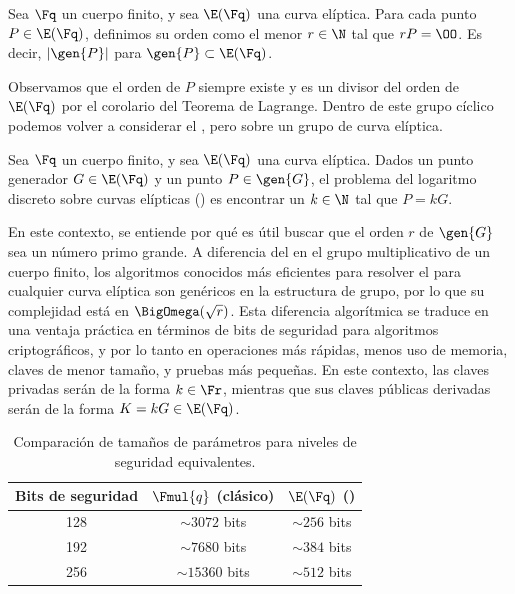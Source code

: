 \begin{definition}
		Sea $\Fq$ un cuerpo finito, y sea $\E(\Fq)$ una curva elíptica. Para cada punto $P \in \E(\Fq)$, definimos su orden como el menor $r \in \N$ tal que $rP = \OO$. Es decir, $|\gen{P}|$ para $\gen{P} \subset \E(\Fq)$.
\end{definition}

Observamos que el orden de $P$ siempre existe y es un divisor del orden de $\E(\Fq)$ por el corolario del Teorema de Lagrange. Dentro de este grupo cíclico podemos volver a considerar el \DLP, pero sobre un grupo de curva elíptica.

\begin{definition}[\ECDLP]
		Sea $\Fq$ un cuerpo finito, y sea $\E(\Fq)$ una curva elíptica. Dados un punto generador $G \in \E(\Fq)$ y un punto $P \in \gen{G}$, el problema del logaritmo discreto sobre curvas elípticas (\ECDLP) es encontrar un $k \in \N$ tal que $P = kG$.
\end{definition}

En este contexto, se entiende por qué es útil buscar que el orden $r$ de $\gen{G}$ sea un número primo grande. A diferencia del \DLP en el grupo multiplicativo de un cuerpo finito, los algoritmos conocidos más eficientes para resolver el \ECDLP para cualquier curva elíptica son genéricos en la estructura de grupo, por lo que su complejidad está en $\BigOmega(\sqrt{r})$. Esta diferencia algorítmica se traduce en una ventaja práctica en términos de bits de seguridad para algoritmos criptográficos, y por lo tanto en operaciones más rápidas, menos uso de memoria, claves de menor tamaño, y pruebas más pequeñas. En este contexto, las claves privadas serán de la forma $k \in \Fr$, mientras que sus claves públicas derivadas serán de la forma $K = kG \in \E(\Fq)$.

\begin{table}[h]
	\centering
	\begin{tabular}{ccc}
		\toprule
		\textbf{Bits de seguridad} &
		\textbf{$\Fmul{q}$ (\DLP clásico)} &
		\textbf{$\E(\Fq)$ (\ECDLP)} \\
		\midrule
		128 & $\sim 3072$ bits & $\sim 256$ bits \\
		192 & $\sim 7680$ bits & $\sim 384$ bits \\
		256 & $\sim 15360$ bits & $\sim 512$ bits \\
		\bottomrule
	\end{tabular}
	\caption{Comparación de tamaños de parámetros para niveles de seguridad equivalentes.}
	\label{tab:security-comparison}
\end{table}

